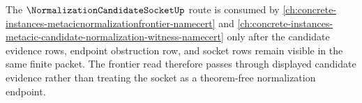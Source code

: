 The $\NormalizationCandidateSocketUp$ route is consumed by \autoref{ch:concrete-instances-metacicnormalizationfrontier-namecert} and \autoref{ch:concrete-instances-metacic-candidate-normalization-witness-namecert} only after the candidate evidence rows, endpoint obstruction row, and socket rows remain visible in the same finite packet. The frontier read therefore passes through displayed candidate evidence rather than treating the socket as a theorem-free normalization endpoint.
